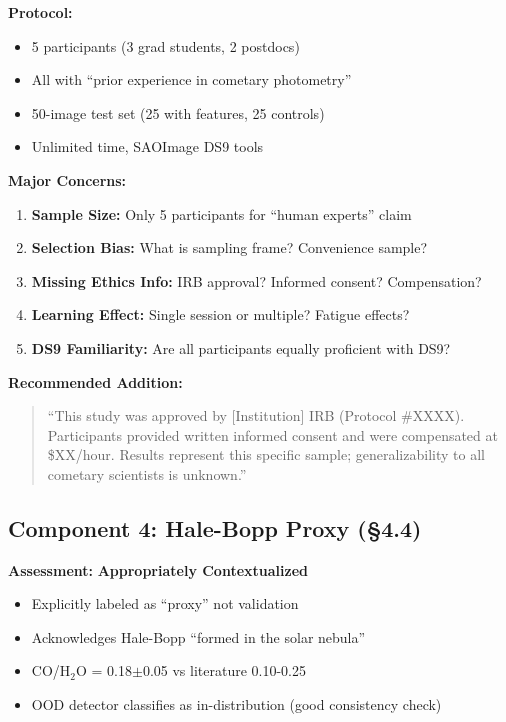 \documentclass[12pt,a4paper]{article}
\newcommand{\critical}[1]{\textcolor{CriticalRed}{\textbf{#1}}}
\newcommand{\warning}[1]{\textcolor{WarningOrange}{\textbf{#1}}}
\newcommand{\good}[1]{\textcolor{GoodGreen}{\textbf{#1}}}
\begin{document}
\textbf{Protocol:}
\begin{itemize}
\item 5 participants (3 grad students, 2 postdocs)
\item All with ``prior experience in cometary photometry''
\item 50-image test set (25 with features, 25 controls)
\item Unlimited time, SAOImage DS9 tools
\end{itemize}

\textbf{\critical{Major Concerns:}}
\begin{enumerate}
\item \critical{Sample Size:} Only 5 participants for ``human experts'' claim
\item \critical{Selection Bias:} What is sampling frame? Convenience sample?
\item \critical{Missing Ethics Info:} IRB approval? Informed consent? Compensation?
\item \warning{Learning Effect:} Single session or multiple? Fatigue effects?
\item \warning{DS9 Familiarity:} Are all participants equally proficient with DS9?
\end{enumerate}

\textbf{Recommended Addition:}
\begin{quote}
``This study was approved by [Institution] IRB (Protocol \#XXXX). Participants provided written informed consent and were compensated at \$XX/hour. Results represent this specific sample; generalizability to all cometary scientists is unknown.''
\end{quote}

\subsection{Component 4: Hale-Bopp Proxy (\S4.4)}

\textbf{Assessment:} \good{Appropriately Contextualized}

\begin{itemize}
\item Explicitly labeled as ``proxy'' not validation
\item Acknowledges Hale-Bopp ``formed in the solar nebula''
\item CO/H$_2$O = 0.18$\pm$0.05 vs literature 0.10-0.25
\item OOD detector classifies as in-distribution (good consistency check)
\end{itemize}
\end{document}
